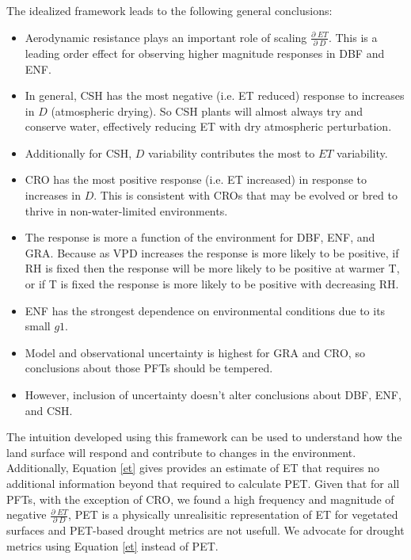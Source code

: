 \documentclass[draft,linenumbers]{agujournal}
\begin{document}
The idealized framework leads to the following general conclusions:
\begin{itemize}
  \item Aerodynamic resistance plays an important role of scaling $\frac{\partial \; ET}{\partial \; D}$. This is a leading order effect for observing higher magnitude responses in DBF and ENF.
  \item In general, CSH has the most negative (i.e. ET reduced) response to increases in $D$ (atmospheric drying). So CSH plants will almost always try and conserve water, effectively reducing ET with dry atmospheric perturbation.
    \item Additionally for CSH, $D$ variability contributes the most to $ET$ variability.
\item CRO has the most positive response (i.e. ET increased) in response to increases in $D$. This is consistent with CROs that may be evolved or bred to thrive in non-water-limited environments.
\item The response is more a function of the environment for DBF, ENF, and GRA. Because as VPD increases the response is more likely to be positive, if RH is fixed then the response will be more likely to be positive at warmer T, or if T is fixed the response is more likely to be positive with decreasing RH.
\item ENF has the strongest dependence on environmental conditions due to its small $g1$.
\item Model and observational uncertainty is highest for GRA and CRO, so conclusions about those PFTs should be tempered.
\item However, inclusion of uncertainty doesn't alter conclusions about DBF, ENF, and CSH.
\end{itemize}

The intuition developed using this framework can be used to understand how the land surface will respond and contribute to changes in the environment. Additionally, Equation \ref{et} gives provides an estimate of ET that requires no additional information beyond that required to calculate PET. Given that for all PFTs, with the exception of CRO, we found a high frequency and magnitude of negative $\frac{\partial \; ET}{\partial \; D}$, PET is a physically unrealisitic representation of ET for vegetated surfaces and PET-based drought metrics are not usefull. We advocate for drought metrics using Equation \ref{et} instead of PET. 


  
\end{document}
